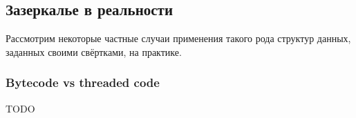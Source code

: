 
\subsection{Зазеркалье в реальности}

Рассмотрим некоторые частные случаи применения такого рода структур данных, заданных своими свёртками, на практике.











\subsubsection{Bytecode vs threaded code} \label{subsubsec:threaded-code}

TODO %





%
%
%




